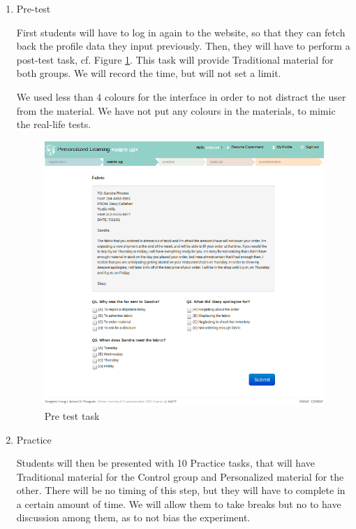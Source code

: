 \documentclass[a4paper,12pt]{article}
\makeatletter
\def\maxwidth{%
  \ifdim\Gin@nat@width>\linewidth
    \linewidth
  \else
    \Gin@nat@width
  \fi
}
\makeatother
\begin{document}
\begin{enumerate}

\item Pre-test

First students will have to log in again to the website, so that they can fetch back the profile data they input previously. Then, they will have to perform a post-test task, cf. Figure \ref{pre_test}. This task will provide Traditional material for both groups. We will record the time, but will not set a limit.

We used less than 4 colours for the interface in order to not distract the user from the material. We have not put any colours in the materials, to mimic the real-life tests.

\begin{figure}
\begin{center}
\includegraphics[width=\maxwidth]{pre_task.png}
\caption{Pre test task}
\label{pre_test}
\end{center}
\end{figure}

\item Practice

Students will then be presented with 10 Practice tasks, that will have Traditional material for the Control group and Personalized material for the other. There will be no timing of this step, but they will have to complete in a certain amount of time. We will allow them to take breaks but no to have discussion among them, as to not bias the experiment.


\end{enumerate}
\end{document}
